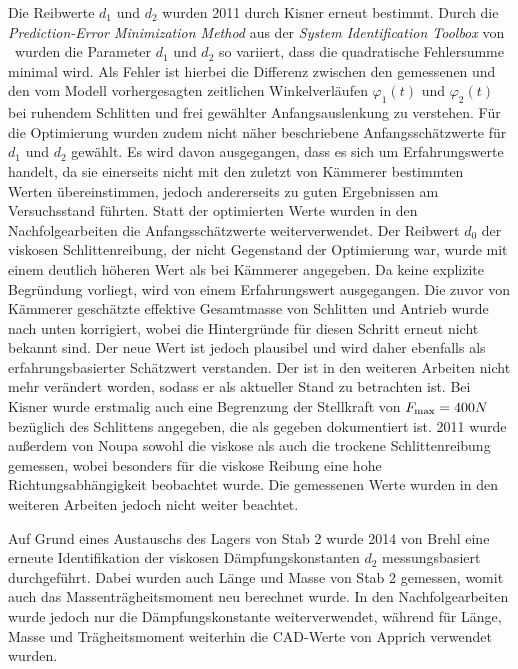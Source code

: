 Die Reibwerte $d_1$ und $d_2$ wurden 2011 durch Kisner \cite{kisner} erneut bestimmt. Durch die \textit{Prediction-Error Minimization Method} aus der \textit{System Identification Toolbox} von \Matlab\ wurden die Parameter $d_1$ und $d_2$ so variiert, dass die quadratische Fehlersumme minimal wird. Als Fehler ist hierbei die Differenz zwischen den gemessenen und den vom Modell vorhergesagten zeitlichen Winkelverläufen $\varphi_1(t)$ und $\varphi_2(t)$ bei ruhendem Schlitten und frei gewählter Anfangsauslenkung zu verstehen. Für die Optimierung wurden zudem nicht näher beschriebene Anfangsschätzwerte für $d_1$ und $d_2$ gewählt. Es wird davon ausgegangen, dass es sich um Erfahrungswerte handelt, da sie einerseits nicht mit den zuletzt von Kämmerer \cite{kämmerer} bestimmten Werten übereinstimmen, jedoch andererseits zu guten Ergebnissen am Versuchsstand führten. Statt der optimierten Werte wurden in den Nachfolgearbeiten die Anfangsschätzwerte weiterverwendet. Der Reibwert $d_0$ der viskosen Schlittenreibung, der nicht Gegenstand der Optimierung war, wurde mit einem deutlich höheren Wert als bei Kämmerer \cite{kämmerer} angegeben. Da keine explizite Begründung vorliegt, wird von einem Erfahrungswert ausgegangen. Die zuvor von Kämmerer \cite{kämmerer} geschätzte effektive Gesamtmasse von Schlitten und Antrieb wurde nach unten korrigiert, wobei die Hintergründe für diesen Schritt erneut nicht bekannt sind. Der neue Wert ist jedoch plausibel und wird daher ebenfalls als erfahrungsbasierter Schätzwert verstanden. Der ist in den weiteren Arbeiten nicht mehr verändert worden, sodass er als aktueller Stand zu betrachten ist. Bei Kisner \cite{kisner} wurde erstmalig auch eine Begrenzung der Stellkraft von $F_{\mathrm{max}}=400 N$ bezüglich des Schlittens angegeben, die als gegeben dokumentiert ist. 2011 wurde außerdem von Noupa \cite{noupa} sowohl die viskose als auch die trockene Schlittenreibung gemessen, wobei besonders für die viskose Reibung eine hohe Richtungsabhängigkeit beobachtet wurde. Die gemessenen Werte wurden in den weiteren Arbeiten jedoch nicht weiter beachtet.

Auf Grund eines Austauschs des Lagers von Stab 2 wurde 2014 von Brehl \cite{brehl} eine erneute Identifikation der viskosen Dämpfungskonstanten $d_2$ messungsbasiert durchgeführt. Dabei wurden auch Länge und Masse von Stab 2 gemessen, womit auch das Massenträgheitsmoment neu berechnet wurde. In den Nachfolgearbeiten wurde jedoch nur die Dämpfungskonstante weiterverwendet, während für Länge, Masse und Trägheitsmoment weiterhin die CAD-Werte von Apprich \cite{apprich} verwendet wurden.  


